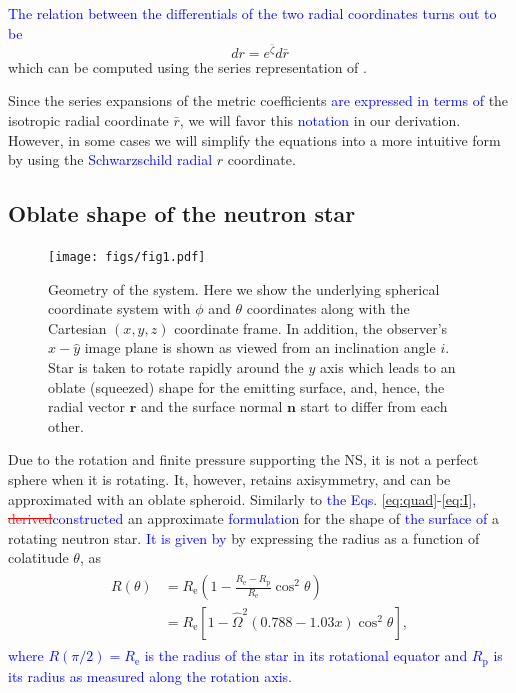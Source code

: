 \documentclass{aa}
\newcommand{\be}{\begin{equation}}
\newcommand{\ee}{\end{equation}}
\renewcommand{\vec}[1]{\ensuremath{\boldsymbol{#1}}}
\newcommand{\refe}[1]{\textcolor{blue}{{#1}}}
\newcommand{\refedel}[1]{\textcolor{red}{\sout{#1}}}
\newcommand{\Req}{\ensuremath{R_{\mathrm{e}}}}
\newcommand{\sch}{Schwarzschild }
\newcommand{\rb}{\ensuremath{\bar{r}}}
\newcommand{\Ob}{\ensuremath{\hat{\Omega}}}
\newcommand{\zetab}{\ensuremath{\bar{\zeta}}}
\begin{document}
\refe{The relation between the differentials of the two radial coordinates turns out to be}
\be\label{eq:drb2dr}
dr = e^{\zetab} d\rb
\ee
which can be computed using the series representation of \cite{BI76}.

Since the series expansions of the metric coefficients \refe{are expressed in terms of} the isotropic radial coordinate $\rb$, we will favor this \refe{notation} in our derivation.  
However, in some cases we will simplify the equations into a more intuitive form by using the \refe{\sch radial} $r$ coordinate.


\subsection{Oblate shape of the neutron star}\label{sect:oblate}

\begin{figure}
\centering
\texttt{[image: figs/fig1.pdf]}
\caption{\label{fig:geom}
Geometry of the system. Here we show the underlying spherical coordinate system with $\phi$ and $\theta$ coordinates along with the Cartesian $(x,y,z)$ coordinate frame.
In addition, the observer's $\hat{x}-\hat{y}$ image plane is shown as viewed from an inclination angle $i$.
Star is taken to rotate rapidly around the $y$ axis which leads to an oblate (squeezed) shape for the emitting surface, and, hence, the radial vector $\vec{r}$ and the surface normal $\vec{n}$ start to differ from each other.
}
\end{figure}

Due to the rotation and finite pressure supporting the NS, it is not a perfect sphere when it is rotating.  
It, however, retains axisymmetry, and can be approximated with an oblate spheroid.  
Similarly to \refe{the Eqs. \eqref{eq:quad}-\eqref{eq:I},} \citet{aGM14} \refedel{derived}\refe{constructed} an approximate \refe{formulation} for the shape of \refe{the surface of} a rotating neutron star. 
\refe{It is given by} by expressing the radius as a function of colatitude $\theta$, as 
\begin{align}\begin{split}\label{eq:radf}
    R(\theta) &= \Req \left( 1 - \frac{\Req - R_{\mathrm{p}}}{\Req} \cos^2\theta \right) \\
              &= \Req [1-\Ob^2 (0.788 - 1.03x) \cos^2 \theta],
\end{split}\end{align}
\refe{where $R(\pi/2) = \Req$ is the radius of the star in its rotational equator and $R_{\mathrm{p}}$ is its radius as measured along the rotation axis.}
\end{document}
